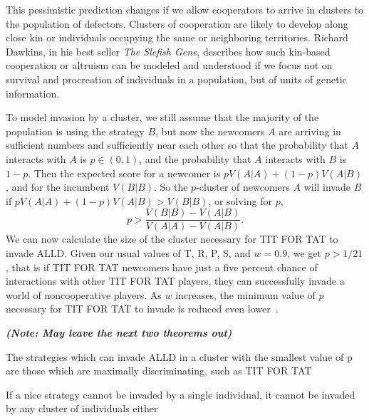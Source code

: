 This pessimistic prediction changes if we allow cooperators to arrive in clusters to the population of defectors. Clusters of cooperation are likely to develop along close kin or individuals occupying the same or neighboring territories. Richard Dawkins, in his best seller \textit{The Slefish Gene}\cite{dawkins2006selfish}, describes how such kin-based cooperation or altruism can be modeled and understood if we focus not on survival and procreation of individuals in a population, but of units of genetic information.

To model invasion by a cluster, we still assume that the majority of the population is using the strategy $B$, but now the newcomers $A$ are arriving in sufficient numbers and sufficiently near each other so that the probability that $A$ interacts with $A$ is $p \in (0, 1)$, and the probability that $A$ interacts with $B$ is $1-p$. Then the expected score for a newcomer is $pV(A | A) + (1-p) V(A | B)$, and for the incumbent $V(B | B)$. So the $p$-cluster of newcomers $A$ will invade $B$ if $pV(A | A) + (1-p) V(A | B) > V(B|B)$, or solving for $p$,
\[
p > \frac{V(B|B) - V(A|B)}{V(A|A) - V(A|B)}.
\]
We can now calculate the size of the cluster necessary for TIT FOR TAT to invade ALLD. Given our usual values of T, R, P, S, and $w = 0.9$, we get $p > 1/21$, that is if TIT FOR TAT newcomers have just a five percent chance of interactions with other TIT FOR TAT players, they can successfully invade a world of noncooperative players. As $w$ increases, the minimum value of $p$ necessary for TIT FOR TAT to invade is reduced even lower~\cite{RobertAxelrod_1981}.

\textit{\textbf{(Note: May leave the next two theorems out)}}
\begin{theorem}\label{thm:alld_stable}
The strategies which can invade ALLD in a cluster with the smallest value of p are those which are maximally discriminating, such as TIT FOR TAT~\cite[Theorem 7]{RobertAxelrod_1981}
\end{theorem}

\begin{theorem}\label{thm:alld_stable}
If a nice strategy cannot be invaded by a single individual, it cannot be invaded by any cluster of individuals either~\cite[Theorem 8]{RobertAxelrod_1981}
\end{theorem}


